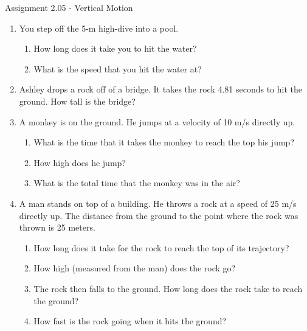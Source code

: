 \documentclass[letterpaper, 12pt]{article}
\newcommand{\assnum}{Assignment 2.05}
\newcommand{\assname}{Vertical Motion}
\begin{document}
\fancyfoot[r]{\assnum}	


\begin{center} \assnum{} - \assname{}
\end{center}





\begin{enumerate}
	\item You step off the 5-m high-dive into a pool.
	\begin{enumerate}
		\item How long does it take you to hit the water?
		\vspace{0.4in}
		\item What is the speed that you hit the water at?
		\vspace{0.4in}
	\end{enumerate}
	\item Ashley drops a rock off of a bridge.  It takes the rock 4.81 seconds to hit the ground.  How tall is the bridge?  
	\vspace{0.4in}
	
	\item A monkey is on the ground.  He jumps at a velocity of 10 m/s directly up.  
		\begin{enumerate}
		\item What is the time that it takes the monkey to reach the top his jump?
		\vspace{0.5in}
		\item How high does he jump?
		\vspace{0.5in}
		\item What is the total time that the monkey was in the air?
		\vspace{0.4in}
	\end{enumerate}
	\item A man stands on top of a building.  He throws a rock at a speed of 25 m/s directly up.  The distance from the ground to the point where the rock was thrown is 25 meters.
	\begin{enumerate}
		\item How long does it take for the rock to reach the top of its trajectory?
		\vspace{0.4in}
		\item How high (measured from the man) does the rock go?
		\vspace{0.4in}
		\item The rock then falls to the ground.  How long does the rock take to reach the ground?
		\vspace{0.4in}
		\item How fast is the rock going when it hits the ground?
			\vspace{0.4in}
	\end{enumerate}


\end{enumerate}
\end{document}
